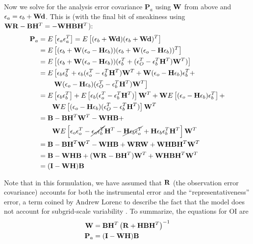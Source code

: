 Now we solve for the analysis error covariance $\mathbf{P} _a $ using $\mbW$ from above and $\mbe _a = \mbe _b + \mbW \mbd$.
This is (with the final bit of sneakiness using $\mbW\mbR-\mbB\mbH^T=-\mbW\mbH\mbB\mbH^T$):
\begin{align*} \mathbf{P} _a &= \expv{\mbe_a \mbe_a^T} = \expv{(\mbe_b+ \mbW \mbd)(\mbe_b + \mbW \mbd)^T}\\
&= \expv{(\mbe_b + \mbW (\mbe _o - \mbH \mbe _b ) ) (\mbe_b + \mbW (\mbe _o - \mbH \mbe _b ) )^T}\\
&= \expv{(\mbe_b + \mbW (\mbe _o - \mbH \mbe _b ) ) (\mbe_b^T + (\mbe _O^T -  \mbe _b^T \mbH ^T )\mbW ^T )}\\
&= E \left [ \mbe_b\mbe_b^T + \mbe_b (\mbe _o^T -  \mbe _b^T \mbH ^T )\mbW ^T + \mbW (\mbe _o - \mbH \mbe _b )  \mbe _b ^T + \right.\\
&~~~~~~\left. \mbW (\mbe _o - \mbH \mbe _b )  (\mbe _O^T -  \mbe _b^T \mbH ^T )\mbW ^T \right ] \\
&= \expv{\mbe_b\mbe_b^T}  + \expv{\mbe_b (\mbe _o^T -  \mbe _b^T \mbH ^T )} \mbW ^T + \mbW \expv{ (\mbe _o - \mbH \mbe _b )  \mbe _b ^T} + \\
&~~~~~~\mbW \expv{(\mbe _o - \mbH \mbe _b )  (\mbe _O^T -  \mbe _b^T \mbH ^T )}\mbW ^T\\
&= \mbB - \mbB \mbH ^T \mbW^T - \mbW \mbH \mbB + \\
&~~~~~~\mbW \expv{\mbe_o\mbe_o^T - \cancel{\mbe_o\mbe_b^T}\mbH ^T - \cancel{\mbH \mbe _b \mbe _o ^T } + \mbH \mbe_b \mbe_b^T \mbH ^T }\mbW ^T\\
&= \mbB - \mbB \mbH ^T \mbW^T - \mbW \mbH \mbB +\mbW \mbR \mbW+  \mbW \mbH \mbB \mbH ^T \mbW ^T\\
&= \mbB - \mbW\mbH\mbB + (\mbW \mbR - \mbB \mbH^T ) \mbW^T + \mbW \mbH \mbB \mbH ^T \mbW ^T\\
&=(\mathbf{I} - \mbW \mbH ) \mbB \end{align*}

Note that in this formulation, we have assumed that $\mbR$ (the observation error covariance) accounts for both the instrumental error and the ``representativeness'' error, a term coined by Andrew Lorenc to describe the fact that the model does not account for subgrid-scale variability .
To summarize, the equations for OI are 
\begin{align} \mbW &= \mbB \mbH ^T \left ( \mbR + \mbH \mbB \mbH ^T \right ) ^{-1}  \\
\mathbf{P} _a &=(\mathbf{I} - \mbW \mbH ) \mbB \end{align}

